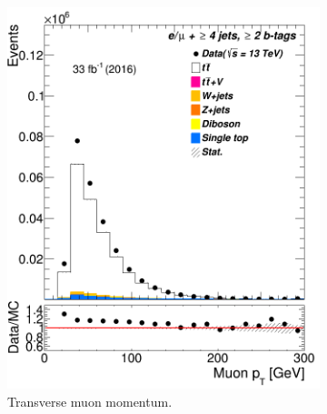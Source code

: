 \begin{figure}
\begin{subfigure}{0.25\textwidth}
		\includegraphics[width=\linewidth]{ControlPlots_emujets_2016_4incl_2incl/mu_pt_emujets_2016.png}
		\caption{Transverse muon momentum.} \label{fig:f1}
	\end{subfigure}\hspace*{1.0cm}
	\begin{subfigure}{0.25\textwidth}

\end{subfigure}
\end{figure}
